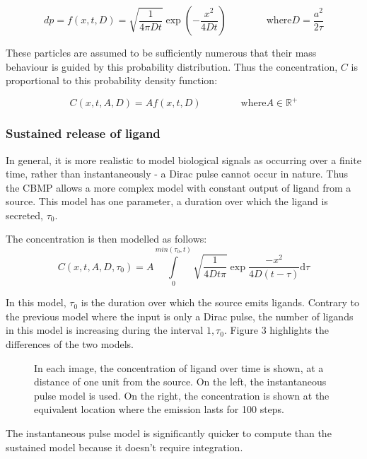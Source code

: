\documentclass[12pt]{article}
\begin{document}
\begin{equation}
  dp = f(x,t,D) = \sqrt{\frac{1}{4\pi Dt}} \exp(-\frac{x^2}{4Dt}) \qquad \qquad \text{where} D = \frac{a^2}{2\tau}
\end{equation}

These particles are assumed to be sufficiently numerous that their mass 
behaviour is guided by this probability distribution. Thus the 
concentration, \(C\) is proportional to this probability density function:

\begin{equation}
  C(x,t,A,D) = Af(x,t,D) \qquad \qquad \text{where} A \in \mathbb{R}^+
\end{equation}

\subsubsection{Sustained release of ligand}
In general, it is more realistic to model biological signals as 
occurring over a finite time, rather than instantaneously - a Dirac 
pulse cannot occur in nature. Thus the CBMP allows a more complex model 
with constant output of ligand from a source. This model has one 
parameter, a duration over which the ligand is secreted, \(\tau_0\).

The concentration is then modelled as follows:
\begin{equation}
  C(x,t,A,D,\tau_0) = A\int\limits_0^{min(\tau_0,t)}\sqrt{\frac{1}{4Dt\pi}}\exp{\frac{-x^2}{4D(t-\tau)}}\mathrm{d}\tau
\end{equation}

In this model, \(\tau_0\) is the duration over which the 
source emits ligands. Contrary to the previous model where the input is 
only a Dirac pulse, the number of ligands in this model is increasing 
during the interval \(1,\tau_0\). Figure 3 
highlights the differences of the two models.

\begin{figure}[H]
\centering
\caption{In each image, the concentration of ligand over time is shown,
  at a distance of one unit from the source. On the left, the instantaneous
  pulse model is used. On the right, the concentration is shown at the
  equivalent location where the emission lasts for 100 steps.}
\end{figure}

The instantaneous pulse model is significantly quicker to compute than the
sustained model because it doesn't require integration.
\end{document}
